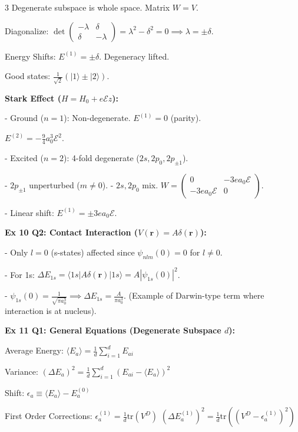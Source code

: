 \documentclass[10pt,a4paper]{article}
\begin{document}
\begin{multicols*}{3}
Degenerate subspace is whole space. Matrix $W = V$.

Diagonalize: $\det \begin{pmatrix} -\lambda & \delta \\ \delta & -\lambda \end{pmatrix} = \lambda^2 - \delta^2 = 0 \implies \lambda = \pm \delta$.

Energy Shifts: $E^{(1)} = \pm \delta$. Degeneracy lifted.

Good states: $\frac{1}{\sqrt{2}}(|1\rangle \pm |2\rangle)$.

\textbf{Stark Effect ($H = H_0 + e\mathcal{E}z$):}

- Ground ($n=1$): Non-degenerate. $E^{(1)}=0$ (parity).

$E^{(2)} = -\frac{9}{4}a_0^3 \mathcal{E}^2$.

- Excited ($n=2$): 4-fold degenerate ($2s, 2p_0, 2p_{\pm 1}$).

    - $2p_{\pm 1}$ unperturbed ($m \neq 0$).
    - $2s, 2p_0$ mix. $W = \begin{pmatrix} 0 & -3ea_0\mathcal{E} \\ -3ea_0\mathcal{E} & 0 \end{pmatrix}$.
    
    - Linear shift: $E^{(1)} = \pm 3ea_0\mathcal{E}$.

\textbf{Ex 10 Q2: Contact Interaction ($V(\mathbf{r}) = A \delta(\mathbf{r})$):}

- Only $l=0$ (s-states) affected since $\psi_{nlm}(0) = 0$ for $l\neq 0$.

- For 1s: $\Delta E_{1s} = \langle 1s | A \delta(\mathbf{r}) | 1s \rangle = A |\psi_{1s}(0)|^2$.

- $\psi_{1s}(0) = \frac{1}{\sqrt{\pi a_0^3}} \implies \Delta E_{1s} = \frac{A}{\pi a_0^3}$.
(Example of Darwin-type term where interaction is at nucleus).

\textbf{Ex 11 Q1: General Equations (Degenerate Subspace $d$):}

Average Energy: $\langle E_a \rangle = \frac{1}{d} \sum_{i=1}^{d} E_{ai}$

Variance: $(\Delta E_a)^2 = \frac{1}{d} \sum_{i=1}^{d} (E_{ai} - \langle E_a \rangle)^2$

Shift: $\epsilon_a \equiv \langle E_a \rangle - E_a^{(0)}$

First Order Corrections:
$\epsilon_a^{(1)} = \frac{1}{d} \text{tr}(V^D)$
$(\Delta E_a^{(1)})^2 = \frac{1}{d} \text{tr}((V^D - \epsilon_a^{(1)})^2)$



\end{multicols*}
\end{document}
